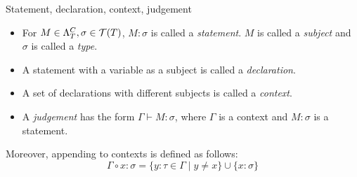 \documentclass[main.tex]{subfiles}
\begin{document}
\begin{defn}
    Statement, declaration, context, judgement
    \begin{itemize}
        \item For $M \in \Lambda_T^C, \sigma \in \mathcal{T}( T )$, $M : \sigma$ is called
            a \emph{statement}. $M$ is called a \emph{subject} and $\sigma$
            is called a \emph{type}.
        \item A statement with a variable as a subject is called a \emph{declaration}.
        \item A set of declarations with different subjects is called a \emph{context}.
        \item A \emph{judgement} has the form $\Gamma \vdash M: \sigma$, where
            $\Gamma$ is a context and $M: \sigma$ is a statement.
    \end{itemize}

    Moreover, appending to contexts is defined as follows:
    \[ \Gamma \circ x : \sigma = \{ y : \tau \in \Gamma \mid y \neq x \}
       \cup \{ x : \sigma \} \]
\end{defn}
\end{document}
